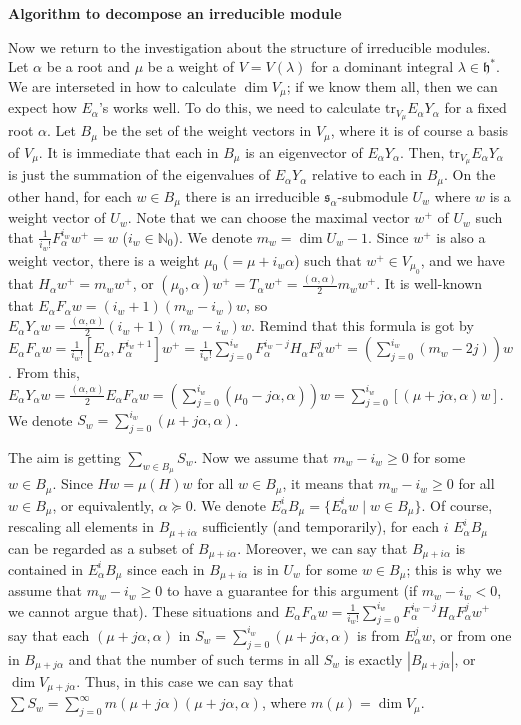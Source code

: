 \documentclass{article}
\newcommand{\NaN}{\mathbb{N}}
\newcommand{\SBar}{\;|\;}
\newcommand{\tru}[2]{\mathrm{tr}_{#1}#2}
\newcommand{\lie}[1]{\mathfrak{#1}}
\begin{document}
\newpage

\textbf{Algorithm to decompose an irreducible module}

Now we return to the investigation about the structure of irreducible modules.
Let $\alpha$ be a root and $\mu$ be a weight of $V = V(\lambda)$ for a dominant integral $\lambda \in\lie{h}^*$.
We are interseted in how to calculate $\dim{V_\mu}$; if we know them all, then we can expect how $E_\alpha$'s works well.
To do this, we need to calculate $\tru{V_\mu}{E_\alpha Y_\alpha}$ for a fixed root $\alpha$.
Let $B_\mu$ be the set of the weight vectors in $V_\mu$, where it is of course a basis of $V_\mu$.
It is immediate that each in $B_\mu$ is an eigenvector of $E_\alpha Y_\alpha$.
Then, $\tru{V_\mu}{E_\alpha Y_\alpha}$ is just the summation of the eigenvalues of $E_\alpha Y_\alpha$ relative to each in $B_\mu$.
On the other hand, for each $w \in B_\mu$ there is an irreducible $\lie{s}_\alpha$-submodule $U_w$ where $w$ is a weight vector of $U_w$.
Note that we can choose the maximal vector $w^+$ of $U_w$ such that $\frac{1}{i_w!} F_\alpha^{i_w} w^+ = w$ ($i_w \in \NaN_0$).
We denote $m_w = \dim{U_w} - 1$.
Since $w^+$ is also a weight vector, there is a weight $\mu_0$ ($=\mu + i_w \alpha$) such that $w^+ \in V_{\mu_0}$, and we have that $H_\alpha w^+ = m_w w^+$, or $(\mu_0, \alpha) w^+ = T_\alpha w^+ = \frac{(\alpha, \alpha)}{2} m_w w^+$.
It is well-known that $E_\alpha F_\alpha w = (i_w + 1)(m_w - i_w) w$, so $E_\alpha Y_\alpha w = \frac{(\alpha, \alpha)}{2} (i_w + 1)(m_w - i_w) w$.
Remind that this formula is got by $E_\alpha F_\alpha w = \frac{1}{i_w!}[E_\alpha, F_\alpha^{i_w + 1}]w^+ = \frac{1}{i_w!} \sum_{j = 0}^{i_w} F_\alpha^{i_w - j} H_\alpha F_\alpha^j w^+ = (\sum_{j = 0}^{i_w} (m_w - 2j)) w$.
From this, $E_\alpha Y_\alpha w = \frac{(\alpha, \alpha)}{2} E_\alpha F_\alpha w = (\sum_{j = 0}^{i_w} (\mu_0 - j\alpha, \alpha)) w = \sum_{j = 0}^{i_w} [(\mu + j\alpha, \alpha) w]$.
We denote $S_w = \sum_{j = 0}^{i_w} (\mu + j\alpha, \alpha)$.

The aim is getting $\sum_{w \in B_\mu} S_w$.
Now we assume that $m_w - i_w \ge 0$ for some $w \in B_\mu$.
Since $Hw = \mu(H)w$ for all $w \in B_\mu$, it means that $m_w - i_w \ge 0$ for all $w \in B_\mu$, or equivalently, $\alpha \succeq 0$.
We denote $E_\alpha^i B_\mu = \{E_\alpha^i w \SBar w \in B_\mu\}$.
Of course, rescaling all elements in $B_{\mu + i\alpha}$ sufficiently (and temporarily), for each $i$ $E_\alpha^i B_\mu$ can be regarded as a subset of $B_{\mu + i\alpha}$.
Moreover, we can say that $B_{\mu + i\alpha}$ is contained in $E_\alpha^i B_\mu$ since each in $B_{\mu + i\alpha}$ is in $U_w$ for some $w \in B_\mu$; this is why we assume that $m_w - i_w \ge 0$ to have a guarantee for this argument (if $m_w - i_w < 0$, we cannot argue that).
These situations and $E_\alpha F_\alpha w = \frac{1}{i_w!} \sum_{j = 0}^{i_w} F_\alpha^{i_w - j} H_\alpha F_\alpha^j w^+$ say that each $(\mu + j\alpha, \alpha)$ in $S_w = \sum_{j = 0}^{i_w} (\mu + j\alpha, \alpha)$ is from $E_\alpha^j w$, or from one in $B_{\mu + j\alpha}$ and that the number of such terms in all $S_w$ is exactly $|B_{\mu + j\alpha}|$, or $\dim{V_{\mu + j\alpha}}$.
Thus, in this case we can say that $\sum S_w = \sum_{j = 0}^\infty m(\mu + j\alpha) (\mu + j\alpha, \alpha)$, where $m(\mu) = \dim{V_\mu}$.
\end{document}
